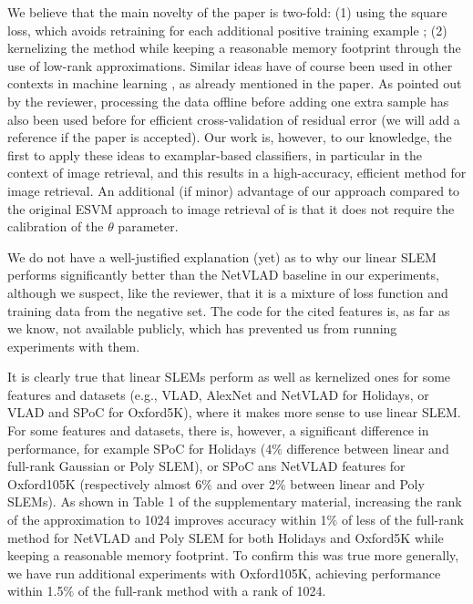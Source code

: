 \documentclass[10pt,twocolumn,letterpaper]{article}
\begin{document}
 We believe that the main novelty of the paper is two-fold: (1) using the square loss, which avoids retraining for each additional positive training example ; (2) kernelizing the method while keeping a reasonable memory footprint through the use of low-rank approximations. Similar ideas have of course been used in other contexts in machine learning \cite{BaJo02,FiSc01}, as already mentioned in the paper.  As pointed out by the reviewer, processing the data offline before adding one extra sample has also been used before for efficient cross-validation of residual error (we will add a reference if the paper is accepted). Our work is, however, to our knowledge, the first to apply these ideas to examplar-based classifiers, in particular in the context of image retrieval, and this results in a high-accuracy, efficient method for image retrieval. An additional (if minor) advantage of our approach compared to the original ESVM approach  to image retrieval of \cite{ZePe15}  is that it does not require the calibration of the $\theta$ parameter.

 We do not have a well-justified explanation (yet) as to why our linear SLEM performs significantly better than the NetVLAD baseline in our experiments, although we suspect, like the reviewer, that it is a mixture of loss function and training data from the negative set. The code for the cited features is, as far as we know, not available publicly, which has prevented us from running experiments with them.

  It is clearly true that linear SLEMs perform as well as kernelized ones for some features and datasets (e.g., VLAD, AlexNet and NetVLAD for Holidays, or VLAD and SPoC for Oxford5K), where it makes more sense to use linear SLEM. For some features and datasets, there is, however, a significant difference in performance, for example SPoC for Holidays (4$\%$ difference between linear and full-rank Gaussian or Poly SLEM), or SPoC ans NetVLAD features for Oxford105K (respectively almost 6$\%$ and over 2$\%$ between linear and Poly SLEMs). As shown in Table 1 of the supplementary material, increasing the rank of the approximation to 1024 improves accuracy within 1$\%$ of less of the full-rank method for NetVLAD and Poly SLEM for both Holidays and Oxford5K while keeping a reasonable memory footprint. To confirm this was true more generally, we have run additional experiments with Oxford105K, achieving performance within 1.5$\%$ of the full-rank method with a rank of 1024.
\end{document}
